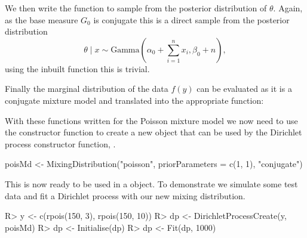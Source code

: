 \documentclass[nojss]{jss}
\begin{document}
We then write the  function to sample from the posterior distribution of $\theta$. Again, as the base measure $G_0$ is conjugate this is a direct sample from the posterior distribution
\begin{equation*}
\theta \mid x \sim \text{Gamma} (\alpha _0 + \sum_{i=1} ^n x_i, \beta_0 + n),
\end{equation*}
using the inbuilt  function this is trivial.

Finally the marginal distribution of the data $f(y)$ can be evaluated as it is a conjugate mixture model and translated into the appropriate  function:

With these functions written for the Poisson mixture model we now need to use the  constructor function to create a new object that can be used by the Dirichlet process constructor function, .
\begin{CodeInput}
poisMd <- MixingDistribution("poisson", priorParameters = c(1, 1), "conjugate")
\end{CodeInput}
This is now ready to be used in a  object. To demonstrate we simulate some test data and fit a Dirichlet process with our new mixing distribution.

\begin{Schunk}
\begin{Sinput}
R> y <- c(rpois(150, 3), rpois(150, 10))
R> dp <- DirichletProcessCreate(y, poisMd)
R> dp <- Initialise(dp)
R> dp <- Fit(dp, 1000)
\end{Sinput}
\end{Schunk}
\end{document}
